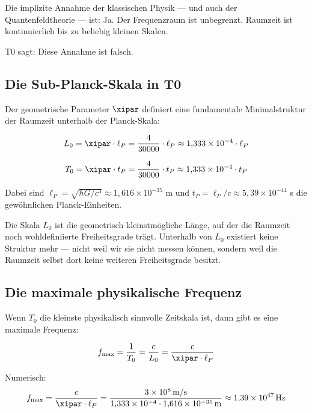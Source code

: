 Die implizite Annahme der klassischen Physik — und auch der Quantenfeldtheorie — 
ist: Ja. Der Frequenzraum ist unbegrenzt. Raumzeit ist kontinuierlich bis zu 
beliebig kleinen Skalen.

T0 sagt: Diese Annahme ist falsch.

\subsection{Die Sub-Planck-Skala in T0}

Der geometrische Parameter $\xipar$ definiert eine fundamentale Minimalstruktur der 
Raumzeit unterhalb der Planck-Skala:

\begin{equation}
    L_0 = \xipar \cdot \ell_P = \frac{4}{30000} \cdot \ell_P \approx 1{,}333 \times 10^{-4} \cdot \ell_P
    \label{eq:subplanck_length}
\end{equation}

\begin{equation}
    T_0 = \xipar \cdot t_P = \frac{4}{30000} \cdot t_P \approx 1{,}333 \times 10^{-4} \cdot t_P
    \label{eq:subplanck_time}
\end{equation}

Dabei sind $\ell_P = \sqrt{\hbar G/c^3} \approx 1{,}616 \times 10^{-35}$ m und 
$t_P = \ell_P/c \approx 5{,}39 \times 10^{-44}$ s die gewöhnlichen Planck-Einheiten.

Die Skala $L_0$ ist die geometrisch kleinstmögliche Länge, auf der die Raumzeit 
noch wohldefiniierte Freiheitsgrade trägt. Unterhalb von $L_0$ existiert keine 
Struktur mehr — nicht weil wir sie nicht messen können, sondern weil die Raumzeit 
selbst dort keine weiteren Freiheitsgrade besitzt.

\subsection{Die maximale physikalische Frequenz}

Wenn $T_0$ die kleinste physikalisch sinnvolle Zeitskala ist, dann gibt es eine 
maximale Frequenz:

\begin{equation}
    f_{\max} = \frac{1}{T_0} = \frac{c}{L_0} = \frac{c}{\xipar \cdot \ell_P}
    \label{eq:f_max}
\end{equation}

Numerisch:
\begin{equation}
    f_{\max} = \frac{c}{\xipar \cdot \ell_P} 
    = \frac{3 \times 10^8 \, \text{m/s}}{1{,}333 \times 10^{-4} \cdot 1{,}616 \times 10^{-35} \, \text{m}}
    \approx 1{,}39 \times 10^{47} \, \text{Hz}
    \label{eq:f_max_numerical}
\end{equation}

